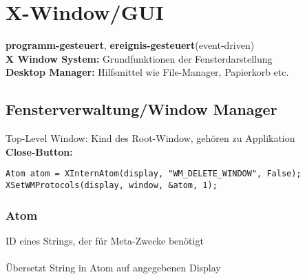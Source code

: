 \section{X-Window/GUI}
\textbf{programm-gesteuert}, \textbf{ereignis-gesteuert}(event-driven)\\
\textbf{X Window System:} Grundfunktionen der Fensterdarstellung\\
\textbf{Desktop Manager:} Hilfsmittel wie File-Manager, Papierkorb etc.\\



\subsection{Fensterverwaltung/Window Manager}
Top-Level Window: Kind des Root-Window, gehören zu Applikation\\
\textbf{Close-Button:} %
\begin{verbatim}
Atom atom = XInternAtom(display, "WM_DELETE_WINDOW", False);
XSetWMProtocols(display, window, &atom, 1);
\end{verbatim}

\subsubsection{Atom}
ID eines Strings, der für Meta-Zwecke benötigt\\
\\
Übersetzt String in Atom auf angegebenen Display

